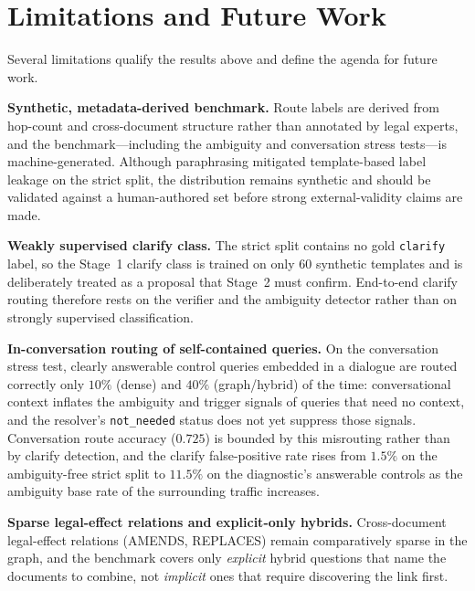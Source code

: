 \section{Limitations and Future Work}\label{sec:limitations}

Several limitations qualify the results above and define the agenda for future
work.

\noindent\textbf{Synthetic, metadata-derived benchmark.} Route labels are
derived from hop-count and cross-document structure rather than annotated by
legal experts, and the benchmark---including the ambiguity and conversation
stress tests---is machine-generated. Although paraphrasing mitigated
template-based label leakage on the strict split, the distribution remains
synthetic and should be validated against a human-authored set before strong
external-validity claims are made.

\noindent\textbf{Weakly supervised clarify class.} The strict split contains
no gold \texttt{clarify} label, so the Stage~1 clarify class is trained on
only $60$ synthetic templates and is deliberately treated as a proposal that
Stage~2 must confirm. End-to-end clarify routing therefore rests on the
verifier and the ambiguity detector rather than on strongly supervised
classification.

\noindent\textbf{In-conversation routing of self-contained queries.} On the
conversation stress test, clearly answerable control queries embedded in a
dialogue are routed correctly only $10\%$ (dense) and $40\%$ (graph/hybrid)
of the time: conversational context inflates the ambiguity and trigger
signals of queries that need no context, and the resolver's
\texttt{not\_needed} status does not yet suppress those signals. Conversation
route accuracy ($0.725$) is bounded by this misrouting rather than by
clarify detection, and the clarify false-positive rate rises from $1.5\%$ on
the ambiguity-free strict split to $11.5\%$ on the diagnostic's answerable
controls as the ambiguity base rate of the surrounding traffic increases.

\noindent\textbf{Sparse legal-effect relations and explicit-only hybrids.}
Cross-document legal-effect relations (\textsc{AMENDS}, \textsc{REPLACES})
remain comparatively sparse in the graph, and the benchmark covers only
\emph{explicit} hybrid questions that name the documents to combine, not
\emph{implicit} ones that require discovering the link first.

